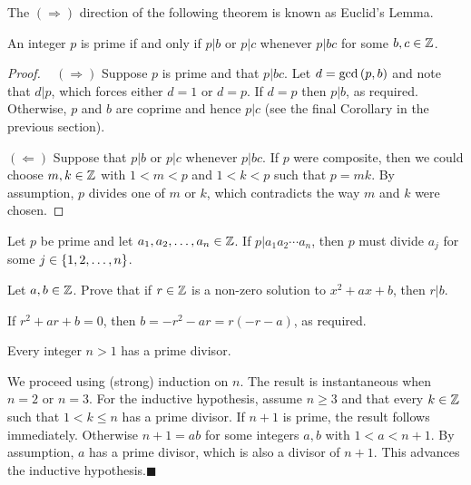 \documentclass[11pt,fleqn,dvipsnames,usenames]{article}
\newcommand{\p}{\noindent}
\newcommand{\ENDPRF}{\hfill $\blacksquare$}
\begin{document}
\p The $(\Rightarrow)$ direction of the following theorem is known as Euclid's Lemma.
\vsp

\begin{theorem}\label{euclidslemma}
An integer $p$ is prime if and only if $p|b$ or $p|c$ whenever $p|bc$ for some $b,c\in\mathbb{Z}$.
\end{theorem}
%
\begin{proof}~
\p $(\Rightarrow)$ Suppose $p$ is prime and that $p|bc$.  Let $d = \text{gcd}\left(p,b\right)$ and note that $d|p$, which forces either $d = 1$ or $d = p$.  If $d = p$ then $p|b$, as required.  Otherwise, $p$ and $b$ are coprime and hence $p|c$ (see the final Corollary in the previous section).
\vsp

\p $(\Leftarrow)$ Suppose that $p|b$ or $p|c$ whenever $p|bc$.  If $p$ were composite, then we could choose $m,k\in\mathbb{Z}$ with $1 < m < p$ and $1 < k < p$ such that $p = mk$.  By assumption, $p$ divides one of $m$ or $k$, which contradicts the way $m$ and $k$ were chosen.
\end{proof}

\begin{corollary} Let $p$ be prime and let $a_{1},a_{2},\ldots, a_{n}\in\mathbb{Z}$.  If $p|a_{1}a_{2}\cdots a_{n}$, then $p$ must divide $a_{j}$ for some $j\in\left\{1,2,\ldots, n\right\}$.
\end{corollary}

\begin{example}
Let $a,b\in\mathbb{Z}$.  Prove that if $r\in\mathbb{Z}$ is a non-zero solution to $x^2 + ax + b$, then $r|b$.
\end{example}

\solution If $r^2 + ar + b = 0$, then $b = -r^2 - ar = r(-r - a)$, as required.
\vsp

\lema Every integer $n > 1$ has a prime divisor.
\vsp

\prf We proceed using (strong) induction on $n$.  The result is instantaneous when $n=2$ or $n=3$.
For the inductive hypothesis, assume $n\geq 3$ and that every $k\in \mathbb{Z}$ such that $1 < k \leq n$ has a prime divisor.  If $n+1$ is prime, the result follows immediately.  Otherwise $n+1 = ab$ for some integers $a,b$ with $1 < a < n+1$.  By assumption, $a$ has a prime divisor, which is also a divisor of $n+1$.  This advances the inductive hypothesis.\ENDPRF
\vsp
\end{document}
